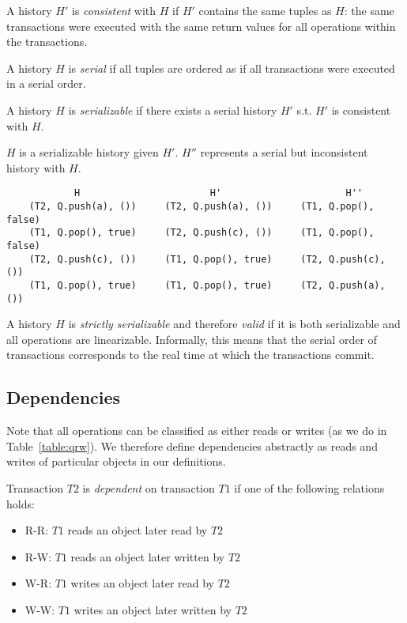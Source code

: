 \begin{defn}
    A history $H'$ is \emph{consistent} with $H$ if $H'$ contains the same tuples as $H$: the same transactions were executed with the same return values for all operations within the transactions.
\end{defn}

\begin{defn}
    A history $H$ is \emph{serial} if all tuples are ordered as if all transactions were executed in a serial order.
\end{defn}
\begin{defn}
    A history $H$ is \emph{serializable} if there exists a serial history $H'$ s.t. $H'$ is consistent with $H$.

\end{defn}

\begin{eg}
$H$ is a serializable history given $H'$. $H''$ represents a serial but inconsistent history with $H$.
\begin{lstlisting}
            H                       H'                      H'' 
    (T2, Q.push(a), ())     (T2, Q.push(a), ())     (T1, Q.pop(), false)
    (T1, Q.pop(), true)     (T2, Q.push(c), ())     (T1, Q.pop(), false)
    (T2, Q.push(c), ())     (T1, Q.pop(), true)     (T2, Q.push(c), ())
    (T1, Q.pop(), true)     (T1, Q.pop(), true)     (T2, Q.push(a), ()) 
\end{lstlisting}
\end{eg}

\begin{defn}
    A history $H$ is \emph{strictly serializable} and therefore \emph{valid} if it is both serializable and all operations are linearizable. Informally, this means that the serial order of transactions corresponds to the real time at which the transactions commit.
\end{defn}

\subsection{Dependencies}

Note that all operations can be classified as either reads or writes (as we do in Table~\ref{table:qrw}). We therefore define dependencies abstractly as reads and writes of particular objects in our definitions.

\begin{defn}
    Transaction $T2$ is \emph{dependent} on transaction $T1$ if one of the following relations holds:
    \begin{itemize}
        \item R-R: $T1$ reads an object later read by $T2$
        \item R-W: $T1$ reads an object later written by $T2$
        \item W-R: $T1$ writes an object later read by $T2$
        \item W-W: $T1$ writes an object later written by $T2$
    \end{itemize}
\end{defn}

